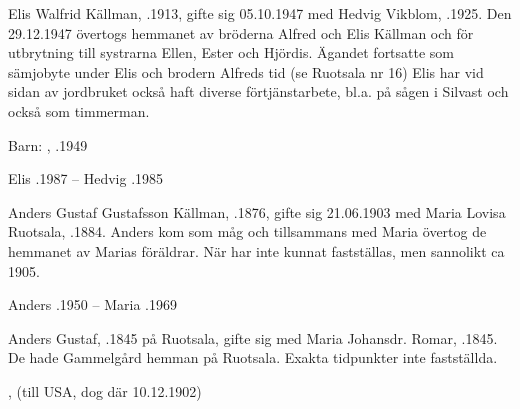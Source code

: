 Elis Walfrid Källman, .1913, gifte sig 05.10.1947 med Hedvig Vikblom, .1925. Den 29.12.1947 övertogs hemmanet av bröderna Alfred och Elis Källman och för utbrytning till systrarna Ellen, Ester och Hjördis. Ägandet fortsatte som sämjobyte under Elis och brodern Alfreds tid (se Ruotsala nr 16) Elis har vid sidan av jordbruket också haft diverse förtjänstarbete, bl.a. på sågen i Silvast och också som timmerman.

Barn: , .1949

Elis .1987  --  Hedvig .1985


Anders Gustaf Gustafsson Källman, .1876, gifte sig 21.06.1903 med Maria Lovisa Ruotsala, .1884. Anders kom som måg och tillsammans med Maria övertog de hemmanet av Marias föräldrar. När har inte kunnat fastställas, men sannolikt ca 1905.
\begin{jhchildren}
  \item {}
  \item {}
  \item {}
  \item {}
  \item {}
  \item {}
  \item {}
\end{jhchildren}
Anders .1950  --  Maria .1969


Anders Gustaf, .1845 på Ruotsala, gifte sig med Maria Johansdr. Romar, .1845. De hade Gammelgård hemman på Ruotsala. Exakta tidpunkter inte fastställda.
\begin{jhchildren}
  \item {}, (till USA, dog där 10.12.1902)
  \item {}
\end{jhchildren}


